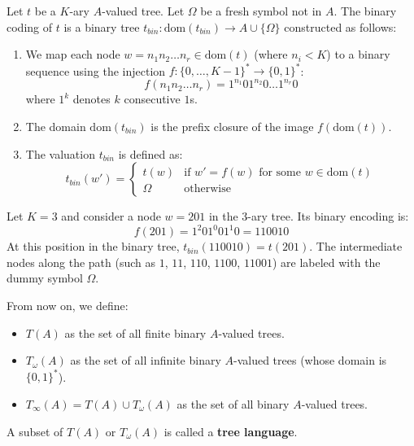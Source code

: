\begin{definition}
\label{def:binary-coding}
Let $t$ be a $K$-ary $A$-valued tree. Let $\Omega$ be a fresh symbol not in $A$. The binary coding of $t$ is a binary tree $t_{bin}: \text{dom}(t_{bin}) \to A \cup \{\Omega\}$ constructed as follows:
\begin{enumerate}
    \item We map each node $w = n_1 n_2 \dots n_r \in \text{dom}(t)$ (where $n_i < K$) to a binary sequence using the injection $f: \{0, \dots, K-1\}^* \to \{0,1\}^*$:
    $$f(n_1 n_2 \dots n_r) = 1^{n_1} 0 1^{n_2} 0 \dots 1^{n_r} 0$$
    where $1^k$ denotes $k$ consecutive $1$s.
    \item The domain $\text{dom}(t_{bin})$ is the prefix closure of the image $f(\text{dom}(t))$.
    \item The valuation $t_{bin}$ is defined as:
    $$t_{bin}(w') = \begin{cases} 
    t(w) & \text{if } w' = f(w) \text{ for some } w \in \text{dom}(t) \\ 
    \Omega & \text{otherwise} 
    \end{cases}$$
\end{enumerate}
\end{definition}

\begin{example}
Let $K=3$ and consider a node $w = 2 0 1$ in the 3-ary tree. Its binary encoding is:
$$f(2 0 1) = 1^2 0 1^0 0 1^1 0 = 110010$$
At this position in the binary tree, $t_{bin}(110010) = t(201)$. The intermediate nodes along the path (such as $1$, $11$, $110$, $1100$, $11001$) are labeled with the dummy symbol $\Omega$.
\end{example}


From now on, we define:
\begin{itemize}
    \item $T(A)$ as the set of all finite binary $A$-valued trees.
    \item $T_\omega(A)$ as the set of all infinite binary $A$-valued trees (whose domain is $\{0,1\}^*$).
    \item $T_\infty(A) = T(A) \cup T_\omega(A)$ as the set of all binary $A$-valued trees.
\end{itemize}
A subset of $T(A)$ or $T_\omega(A)$ is called a \textbf{tree language}.

